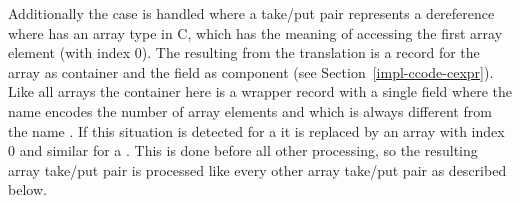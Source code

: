 Additionally the case is handled where a take/put pair represents a dereference  where  has an array type in C,
which has the meaning of accessing the first array element (with index 0). The  resulting from the translation is a
record  for the array as container and the field  as component (see Section~\ref{impl-ccode-cexpr}). Like
all arrays the container here is a wrapper record with a single field where the name encodes the number of array elements and
which is always different from the name . If this situation is detected for a  it is replaced by an array
 with index 0 and similar for a . This is done before all other processing, so the resulting array take/put
pair is processed like every other array take/put pair as described below.

